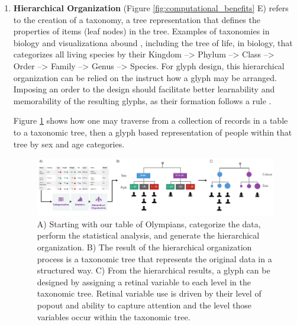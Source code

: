 \begin{enumerate}
\item \textbf{Hierarchical Organization} (Figure \ref{fig:computational_benefits} E) refers to the creation of a taxonomy, a tree representation that defines the properties of items (leaf nodes) in the tree. Examples of taxonomies in biology and visualizationa abound \cite{maguire12}, including the tree of life, in biology, that categorizes all living species by their Kingdom --> Phylum --> Class --> Order --> Family --> Genus --> Species. 
For glyph design, this hierarchical organization can be relied on the instruct how a glyph may be arranged.
Imposing an order to the design should facilitate better learnability and memorability of the resulting glyphs, as their formation follows a rule \cite{franks71}.

Figure \ref{fig:taxonomic_glyph_design} shows how one may traverse from a collection of records in a table to a taxonomic tree, then a glyph based representation of people within that tree by sex and age categories.

\begin{figure}[h!]
\centering
\includegraphics[width=\textwidth]{images/ch3/table_tax_glyph}
\caption{A) Starting with our table of Olympians, categorize the data, perform the statistical analysis, and generate the hierarchical organization.
B) The result of the hierarchical organization process is a taxonomic tree that represents the original data in a structured way.
C) From the hierarchical results, a glyph can be designed by assigning a retinal variable to each level in the taxonomic tree. Retinal variable use is driven by their level of popout and ability to capture attention and the level those variables occur within the taxonomic tree.}
\label{fig:taxonomic_glyph_design}
\end{figure}

\end{enumerate}





